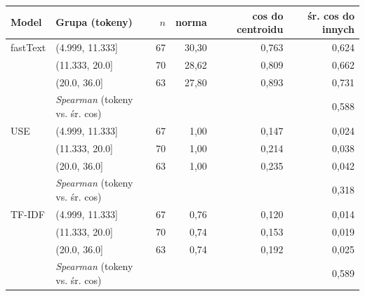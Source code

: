 \begin{tabular}{llrrrr}
\toprule
Model & Grupa (tokeny) & $n$ & norma & cos do centroidu & śr. cos do innych \\
\midrule
fastText & (4.999, 11.333] & 67 & 30{,}30 & 0{,}763 & 0{,}624 \\
 & (11.333, 20.0] & 70 & 28{,}62 & 0{,}809 & 0{,}662 \\
 & (20.0, 36.0] & 63 & 27{,}80 & 0{,}893 & 0{,}731 \\
 & \emph{Spearman} (tokeny vs. śr. cos) &  &  &  & 0{,}588 \\
\midrule
USE & (4.999, 11.333] & 67 & 1{,}00 & 0{,}147 & 0{,}024 \\
 & (11.333, 20.0] & 70 & 1{,}00 & 0{,}214 & 0{,}038 \\
 & (20.0, 36.0] & 63 & 1{,}00 & 0{,}235 & 0{,}042 \\
 & \emph{Spearman} (tokeny vs. śr. cos) &  &  &  & 0{,}318 \\
\midrule
TF-IDF & (4.999, 11.333] & 67 & 0{,}76 & 0{,}120 & 0{,}014 \\
 & (11.333, 20.0] & 70 & 0{,}74 & 0{,}153 & 0{,}019 \\
 & (20.0, 36.0] & 63 & 0{,}74 & 0{,}192 & 0{,}025 \\
 & \emph{Spearman} (tokeny vs. śr. cos) &  &  &  & 0{,}589 \\
\bottomrule
\end{tabular}
